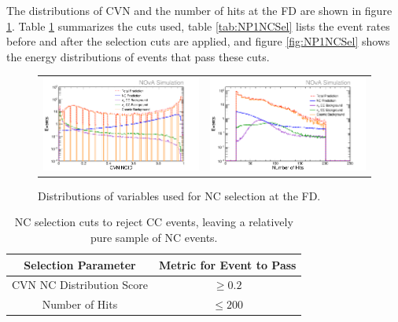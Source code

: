 The distributions of CVN and the number of hits at the FD are shown in figure \ref{fig:NCSel}. Table \ref{tab:NCSel} summarizes the cuts used, table \ref{tab:NP1NCSel} lists the event rates before and after the selection cuts are applied, and figure \ref{fig:NP1NCSel} shows the energy distributions of events that pass these cuts.
\begin{figure}[htb]
  \centering
  \begin{tabular}{c c}
    \includegraphics[width=.47\textwidth]{figures/NP1CVNC.png} &
    \includegraphics[width=.47\textwidth]{figures/NP1NHit.png} \\
  \end{tabular}
  \caption[NC Selection Variable Distributions]{Distributions of variables used for NC selection at the FD.}
  \label{fig:NCSel}
\end{figure}

\begin{table}[htb]
  \begin{center}
    \caption[NC Selection Cuts]{NC selection cuts to reject CC events, leaving a relatively pure sample of NC events.}
    \label{tab:NCSel}
    \begin{tabular}{c c}
      \hline\hline
      Selection Parameter & Metric for Event to Pass \\
      \hline
      CVN NC Distribution Score & $\geq 0.2$ \\
      Number of Hits & $\leq 200$ \\
      \hline
    \end{tabular}
  \end{center}
\end{table}

